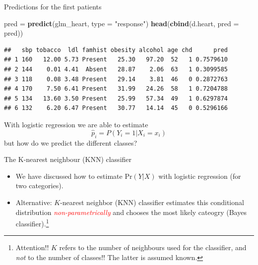\documentclass[
  10pt,
  ignorenonframetext,
]{beamer}
\newenvironment{Shaded}{\begin{snugshade}}{\end{snugshade}}
\newcommand{\AttributeTok}[1]{\textcolor[rgb]{0.13,0.29,0.53}{#1}}
\newcommand{\FunctionTok}[1]{\textcolor[rgb]{0.13,0.29,0.53}{\textbf{#1}}}
\newcommand{\NormalTok}[1]{#1}
\newcommand{\OtherTok}[1]{\textcolor[rgb]{0.56,0.35,0.01}{#1}}
\newcommand{\StringTok}[1]{\textcolor[rgb]{0.31,0.60,0.02}{#1}}
\providecommand{\tightlist}{%
  \setlength{\itemsep}{0pt}\setlength{\parskip}{0pt}}
\begin{document}
\begin{frame}[fragile]
\begin{block}{Predictions for the first patients}
\protect\hypertarget{predictions-for-the-first-patients}{}
\begin{Shaded}
\begin{Highlighting}[]
\NormalTok{pred }\OtherTok{=} \FunctionTok{predict}\NormalTok{(glm\_heart, }\AttributeTok{type =} \StringTok{"response"}\NormalTok{)}
\FunctionTok{head}\NormalTok{(}\FunctionTok{cbind}\NormalTok{(d.heart, }\AttributeTok{pred =}\NormalTok{ pred))}
\end{Highlighting}
\end{Shaded}

\begin{verbatim}
##   sbp tobacco  ldl famhist obesity alcohol age chd      pred
## 1 160   12.00 5.73 Present   25.30   97.20  52   1 0.7579610
## 2 144    0.01 4.41  Absent   28.87    2.06  63   1 0.3099585
## 3 118    0.08 3.48 Present   29.14    3.81  46   0 0.2872763
## 4 170    7.50 6.41 Present   31.99   24.26  58   1 0.7204788
## 5 134   13.60 3.50 Present   25.99   57.34  49   1 0.6297874
## 6 132    6.20 6.47 Present   30.77   14.14  45   0 0.5296166
\end{verbatim}
\end{block}
\end{frame}

\begin{frame}
With logistic regression we are able to estimate \[
\hat{p}_i = P(Y_i = 1|X_i = x_i)
\] but how do we predict the different classes?
\end{frame}

\begin{frame}{The K-nearest neighbour (KNN) classifier}
\protect\hypertarget{the-k-nearest-neighbour-knn-classifier}{}
\begin{itemize}
\tightlist
\item
  We have discussed how to estimate \(\text{Pr}(Y | X)\) with logistic
  regression (for two categories).
\end{itemize}

\vspace{1mm}

\vspace{1mm}

\begin{itemize}
\tightlist
\item
  Alternative: \(K\)-nearest neighbor (KNN) classifier estimates this
  conditional distribution \emph{\textcolor{red}{non-parametrically}}
  and chooses the most likely cateogry (Bayes
  classifier).\footnote{Attention!! $K$ refers to the number of neighbours used for the classifier, and \emph{not} to the number of classes!! The latter is assumed known.}
\end{itemize}
\end{frame}
\end{document}
